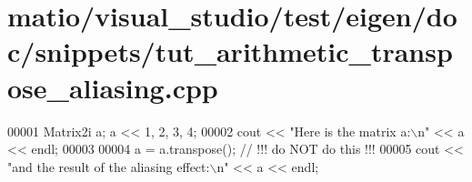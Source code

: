 \hypertarget{matio_2visual__studio_2test_2eigen_2doc_2snippets_2tut__arithmetic__transpose__aliasing_8cpp_source}{}\section{matio/visual\+\_\+studio/test/eigen/doc/snippets/tut\+\_\+arithmetic\+\_\+transpose\+\_\+aliasing.cpp}
\label{matio_2visual__studio_2test_2eigen_2doc_2snippets_2tut__arithmetic__transpose__aliasing_8cpp_source}

\begin{DoxyCode}
00001 Matrix2i a; a << 1, 2, 3, 4;
00002 cout << \textcolor{stringliteral}{"Here is the matrix a:\(\backslash\)n"} << a << endl;
00003 
00004 a = a.transpose(); \textcolor{comment}{// !!! do NOT do this !!!}
00005 cout << \textcolor{stringliteral}{"and the result of the aliasing effect:\(\backslash\)n"} << a << endl;
\end{DoxyCode}

